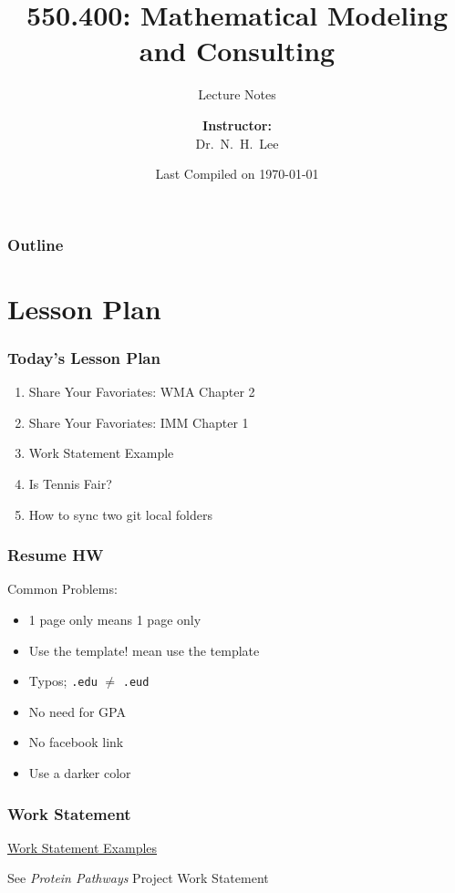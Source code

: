 \documentclass[hyperref={colorlinks=false},handout,10pt]{beamer}
\title{{\color{blue} \LARGE 550.400: Mathematical Modeling and Consulting\newline} }
\subtitle{{\color{red} \large Lecture Notes} }
\author{ 
    {\bf{Instructor:}} \\ 
Dr.~N.~H.~Lee \\ 
    \vspace{5pt}
}
\institute{JHU AMS 2012 FALL}
\date{\mygreen Last Compiled on \today}
\let\olditem\item
\renewcommand{\item}{\setlength{\itemsep}{0.5\baselineskip}\olditem}
\begin{document}
\begin{frame}[plain]
  \titlepage
\end{frame}

\begin{frame}
  \frametitle{Outline}
  \tableofcontents
\end{frame}

\section{Lesson Plan}
\begin{frame}%
    \frametitle{Today's Lesson Plan}
    \begin{enumerate}
        \item Share Your Favoriates: WMA Chapter 2
        \item Share Your Favoriates: IMM Chapter 1
        \item Work Statement Example
        \item Is Tennis Fair?
        \item How to sync two git local folders
    \end{enumerate} 
\end{frame}

\begin{frame}
    \frametitle{Resume HW}
    Common Problems:
    \begin{itemize}
        \item 1 page only means 1 page only
        \item Use the template! mean use the template
        \item Typos; \texttt{.edu} $\neq$ \texttt{.eud}
        \item No need for GPA 
        \item No facebook link
        \item Use a darker color
    \end{itemize}
\end{frame}

\begin{frame}
    \frametitle{Work Statement}
    \begin{center}
        \href{http://www.ipam.ucla.edu/programs/rips2002/rips2002_projects.html}{Work Statement Examples}
    \end{center}
    \begin{description}
        \item[\quad] See \emph{Protein Pathways} Project Work Statement 
    \end{description}
\end{frame}
\end{document}

